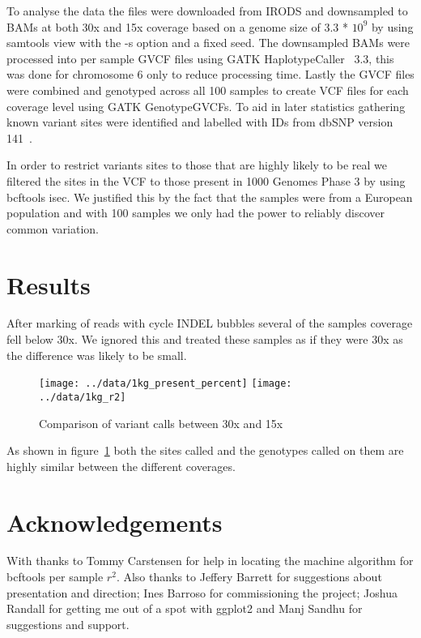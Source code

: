 \documentclass{article}
\begin{document}
  To analyse the data the files were downloaded from IRODS and downsampled to BAMs at both 30x and 15x coverage based on a genome size of 3.3 *  $10^{9}$ by using samtools view with the -s option and a fixed seed. The downsampled BAMs were processed into per sample GVCF files using GATK HaplotypeCaller~\cite{gatk} 3.3, this was done for chromosome 6 only to reduce processing time. Lastly the GVCF files were combined and genotyped across all 100 samples to create VCF files for each coverage level using GATK GenotypeGVCFs. To aid in later statistics gathering known variant sites were identified and labelled with IDs from dbSNP version 141~\cite{dbsnp}.

  In order to restrict variants sites to those that are highly likely to be real we filtered the sites in the VCF to those present in 1000 Genomes Phase 3 by using bcftools isec. We justified this by the fact that the samples were from a European population and with 100 samples we only had the power to reliably discover common variation.

  \section{Results}
  After marking of reads with cycle INDEL bubbles several of the samples coverage fell below 30x. We ignored this and treated these samples as if they
  were 30x as the difference was likely to be small.
  
  \begin{figure}[h]
    \caption{Comparison of variant calls between 30x and 15x}
    \label{fig:compare}
    \texttt{[image: ../data/1kg\_present\_percent]}
    \texttt{[image: ../data/1kg\_r2]}
  \end{figure}

  As shown in figure~\ref{fig:compare} both the sites called and the genotypes called on them are highly similar between the different coverages.

  \section{Acknowledgements}
  With thanks to Tommy Carstensen for help in locating the machine algorithm for bcftools
  per sample $r^{2}$. Also thanks to Jeffery Barrett for suggestions about presentation and direction;
  Ines Barroso for commissioning the project; Joshua Randall for getting me out of a spot
  with ggplot2 and Manj Sandhu for suggestions and support.
\end{document}
